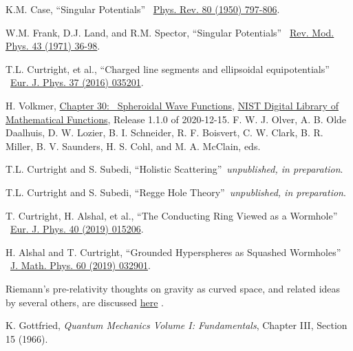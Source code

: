 \documentclass{article}%
\begin{document}
\begin{thebibliography}{99}
K.M. Case, \textquotedblleft Singular
Potentials\textquotedblright%
\ \href{https://doi.org/10.1103/PhysRev.80.797}{Phys. Rev. 80 (1950) 797-806}.

W.M. Frank, D.J. Land, and R.M. Spector,
\textquotedblleft Singular Potentials\textquotedblright%
\ \href{https://doi.org/10.1103/RevModPhys.43.36}{Rev. Mod. Phys. 43 (1971)
36-98}.

T.L. Curtright, et al., \textquotedblleft Charged line
segments and ellipsoidal equipotentials\textquotedblright%
\ \href{https://doi.org/10.1088/0143-0807/37/3/035201}{Eur. J. Phys. 37 (2016)
035201}.

H. Volkmer, \href{https://dlmf.nist.gov/30}{Chapter 30:
\ Spheroidal Wave Functions}, \href{http://dlmf.nist.gov/}{NIST Digital
Library of Mathematical Functions}, Release 1.1.0 of 2020-12-15. F. W. J.
Olver, A. B. Olde Daalhuis, D. W. Lozier, B. I. Schneider, R. F. Boisvert, C.
W. Clark, B. R. Miller, B. V. Saunders, H. S. Cohl, and M. A. McClain, eds.

T.L. Curtright and S. Subedi, \textquotedblleft Holistic
Scattering\textquotedblright\ \emph{unpublished, in preparation}.

T.L. Curtright and S. Subedi, \textquotedblleft Regge Hole
Theory\textquotedblright\ \emph{unpublished, in preparation}.

T. Curtright, H. Alshal, et al., \textquotedblleft The
Conducting Ring Viewed as a Wormhole\textquotedblright%
\ \href{https://iopscience.iop.org/article/10.1088/1361-6404/aae3cd}{Eur. J.
Phys. 40 (2019) 015206}.

H. Alshal and T. Curtright, \textquotedblleft Grounded
Hyperspheres as Squashed Wormholes\textquotedblright%
\ \href{https://aip.scitation.org/doi/10.1063/1.5044432}{J. Math. Phys. 60
(2019) 032901}.

Riemann's pre-relativity thoughts on gravity as curved
space, and related ideas by several others, are discussed
\href{https://hsm.stackexchange.com/questions/9585/what-are-the-references-for-riemanns-discussion-of-gravity#:~:text=Similar%20to%20Newton%2C%20but%20mathematically%20in%20greater%20detail%2C,and%20normal%20matter%20represents%20sinks%20in%20this%20aether.}{here}%
.

K. Gottfried, \textit{Quantum Mechanics Volume I:
Fundamentals}, Chapter III, Section 15 (1966).
\end{thebibliography}
\end{document}
